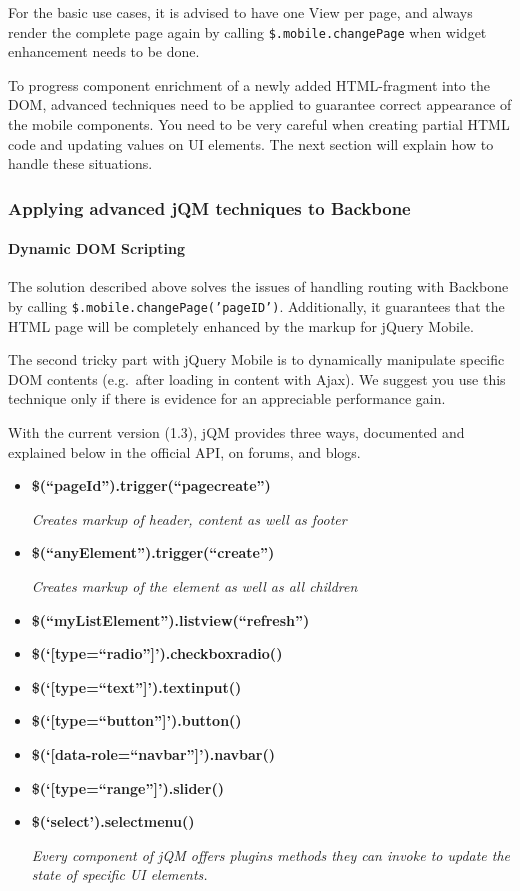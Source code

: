\documentclass[9pt]{book}
\begin{document}
For the basic use cases, it is advised to have one View per page, and
always render the complete page again by calling
\texttt{\$.mobile.changePage} when widget enhancement needs to be done.

To progress component enrichment of a newly added HTML-fragment into the
DOM, advanced techniques need to be applied to guarantee correct
appearance of the mobile components. You need to be very careful when
creating partial HTML code and updating values on UI elements. The next
section will explain how to handle these situations.

\subsubsection{Applying advanced jQM techniques to
Backbone}\label{applying-advanced-jqm-techniques-to-backbone}

\paragraph{Dynamic DOM Scripting}\label{dynamic-dom-scripting}

The solution described above solves the issues of handling routing with
Backbone by calling \texttt{\$.mobile.changePage('pageID')}.
Additionally, it guarantees that the HTML page will be completely
enhanced by the markup for jQuery Mobile.

The second tricky part with jQuery Mobile is to dynamically manipulate
specific DOM contents (e.g.~after loading in content with Ajax). We
suggest you use this technique only if there is evidence for an
appreciable performance gain.

With the current version (1.3), jQM provides three ways, documented and
explained below in the official API, on forums, and blogs.

\begin{itemize}
\item
  \textbf{\$(``pageId'').trigger(``pagecreate'')}

  \emph{Creates markup of header, content as well as footer}
\item
  \textbf{\$(``anyElement'').trigger(``create'')}

  \emph{Creates markup of the element as well as all children}
\item
  \textbf{\$(``myListElement'').listview(``refresh'')}
\item
  \textbf{\$(`{[}type=``radio''{]}').checkboxradio()}
\item
  \textbf{\$(`{[}type=``text''{]}').textinput()}
\item
  \textbf{\$(`{[}type=``button''{]}').button()}
\item
  \textbf{\$(`{[}data-role=``navbar''{]}').navbar()}
\item
  \textbf{\$(`{[}type=``range''{]}').slider()}
\item
  \textbf{\$(`select').selectmenu()}

  \emph{Every component of jQM offers plugins methods they can invoke to
  update the state of specific UI elements.}
\end{itemize}
\end{document}
